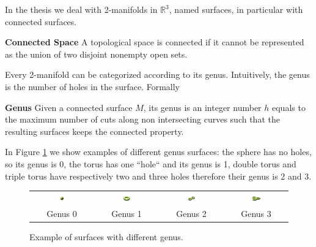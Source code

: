 In the thesis we deal with 2-manifolds in $\mathbb{R}^3$, named surfaces, in particular with connected surfaces. 

\begin{mydef}
\textbf{Connected Space}
A topological space is connected if it cannot be represented as the union of two disjoint nonempty open sets. 
\end{mydef}

Every 2-manifold can be categorized according to its genus. Intuitively, the genus is the number of holes in the surface. Formally


 
\begin{mydef}
\textbf{Genus}
Given a connected surface $M$, its genus is an integer number $h$ equals to the maximum number of cuts along non intersecting curves such that the resulting surfaces keeps the connected property.
\end{mydef}

In Figure \ref{fig:torus} we show examples of different genus surfaces: the sphere has no holes, so its genus is 0, the torus has one ``hole`` and its genus is 1, double torus and triple torus have respectively two and three holes therefore their genus is 2 and 3.
\begin{figure}

 \begin{tabular}{cccc}
  \includegraphics[width=0.2\textwidth]{./img/sphere}&
  \includegraphics[width=0.2\textwidth]{./img/torus}&
  \includegraphics[width=0.2\textwidth]{./img/doubleTorus}&
  \includegraphics[width=0.2\textwidth]{./img/tripletorus}\\
  Genus 0 & Genus 1 & Genus 2 & Genus 3
 \end{tabular}
 \caption{Example of surfaces with different genus.}
 \label{fig:torus}
\end{figure}



